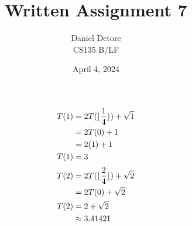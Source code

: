\documentclass{article}
\title{Written Assignment 7}
\author{Daniel Detore\\CS135 B/LF}
\date{April 4, 2024}
\DeclarePairedDelimiter{\floor}{\lfloor}{\rfloor}
\begin{document}
\maketitle
\raggedright

\section{}
\subsection{}
\begin{align*}
    T(1) &= 2T(\floor{\frac{1}{4}}) + \sqrt{1} \\
         &= 2T(0) + 1 \\
         &= 2(1) + 1 \\
    T(1) &= 3
\end{align*}
\begin{align*}
    T(2) &= 2T(\floor{\frac{2}{4}}) + \sqrt{2} \\
         &= 2T(0) + \sqrt{2} \\
    T(2) &= 2 + \sqrt{2}\\
         &\approx 3.41421
\end{align*}
\end{document}
